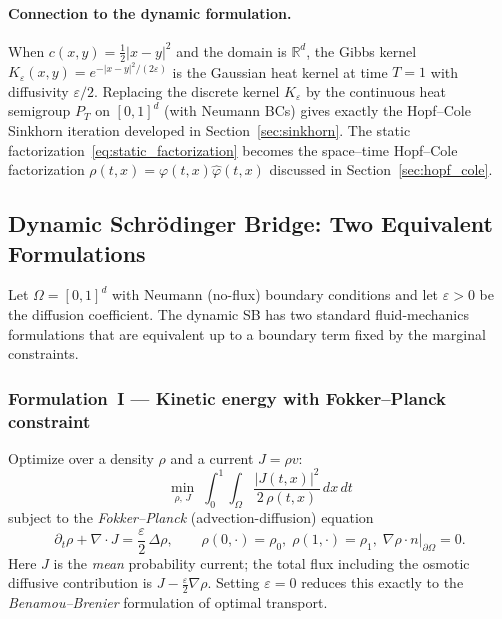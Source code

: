 \documentclass[11pt,a4paper]{article}
\newcommand{\eps}{\varepsilon}
\newcommand{\R}{\mathbb{R}}
\begin{document}
\paragraph{Connection to the dynamic formulation.}
When $c(x,y) = \tfrac{1}{2}|x-y|^2$ and the domain is $\R^d$, the Gibbs
kernel $K_\eps(x,y) = e^{-|x-y|^2/(2\eps)}$ is the Gaussian heat kernel at
time $T=1$ with diffusivity $\eps/2$.
Replacing the discrete kernel $K_\eps$ by the continuous heat semigroup
$P_T$ on $[0,1]^d$ (with Neumann BCs) gives exactly the Hopf--Cole
Sinkhorn iteration developed in Section~\ref{sec:sinkhorn}.
The static factorization~\eqref{eq:static_factorization} becomes the
space--time Hopf--Cole factorization $\rho(t,x) = \varphi(t,x)\hat\varphi(t,x)$
discussed in Section~\ref{sec:hopf_cole}.

\subsection{Dynamic Schr\"{o}dinger Bridge: Two Equivalent Formulations}

Let $\Omega = [0,1]^d$ with Neumann (no-flux) boundary conditions and let
$\eps > 0$ be the diffusion coefficient.
The dynamic SB has two standard fluid-mechanics formulations that are
equivalent up to a boundary term fixed by the marginal constraints.

\subsubsection*{Formulation~I — Kinetic energy with Fokker--Planck constraint}

Optimize over a density $\rho$ and a current $J = \rho v$:
\begin{equation}\label{eq:SB_FP}
  \boxed{
  \min_{\rho,\,J}\;
  \int_0^1\!\int_\Omega
    \frac{|J(t,x)|^2}{2\,\rho(t,x)}\,dx\,dt
  }
\end{equation}
subject to the \emph{Fokker--Planck} (advection-diffusion) equation
\begin{equation}\label{eq:FP_constraint}
  \partial_t\rho + \nabla\cdot J = \frac\eps 2\,\Delta\rho,
  \qquad
  \rho(0,\cdot)=\rho_0,\;\rho(1,\cdot)=\rho_1,\;
  \nabla\rho\cdot n\big|_{\partial\Omega}=0.
\end{equation}
Here $J$ is the \emph{mean} probability current; the total flux including
the osmotic diffusive contribution is $J - \frac\eps 2\nabla\rho$.
Setting $\eps=0$ reduces this exactly to the \emph{Benamou--Brenier}
formulation of optimal transport.
\end{document}
